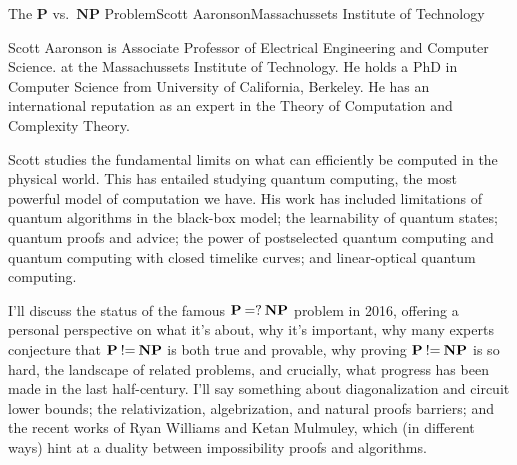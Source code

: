 \documentclass{hrumc}
\begin{document}
\vspace*{5ex}
\begin{plenary}{The $\mathbf{P}$ vs.\ $\mathbf{NP}$ Problem}{Scott Aaronson}{Massachussets Institute of Technology}{Scott Aaronson is Associate Professor of Electrical Engineering and Computer Science.
at the Massachussets Institute of Technology. He holds a PhD in Computer Science from University of California, Berkeley. He has an international reputation as an expert in the Theory of Computation and Complexity Theory.

Scott studies the fundamental limits on what can efficiently be computed in the physical world. This has entailed studying quantum computing, the most powerful model of computation we have. His work has included limitations of quantum algorithms in the black-box model; the learnability of quantum states; quantum proofs and advice; the power of postselected quantum computing and quantum computing with closed timelike curves; and linear-optical quantum computing.}

I'll discuss the status of the famous $\mathbf{P}\mathbin{\hbox{=?}}\mathbf{NP}$ 
problem in 2016, offering
a personal perspective on what it's about, why it's important, why
many experts conjecture that $\mathbf{P}\mathbin{\hbox{!=}}\mathbf{NP}$ is both true and provable, why
proving $\mathbf{P}\mathbin{\hbox{!=}}\mathbf{NP}$ is so hard, the landscape of related problems, and
crucially, what progress has been made in the last half-century.  I'll
say something about diagonalization and circuit lower bounds; the
relativization, algebrization, and natural proofs barriers; and the
recent works of Ryan Williams and Ketan Mulmuley, which (in different
ways) hint at a duality between impossibility proofs and algorithms.
\end{plenary}
\vspace*{1ex plus 1fill}


\restoregeometry








\end{document}
